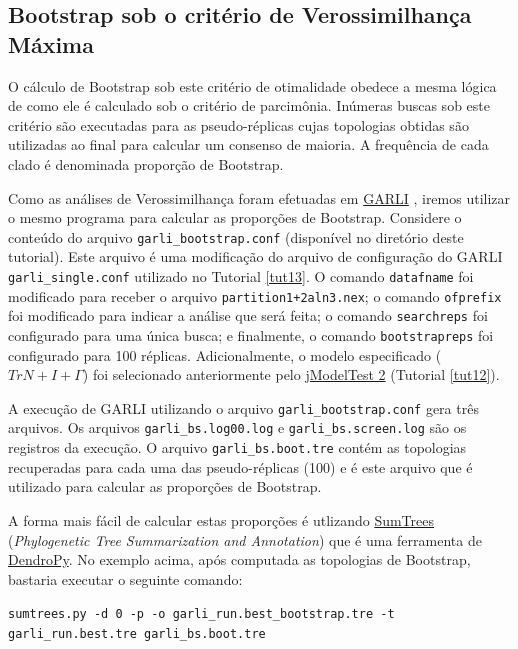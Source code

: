 \begin{refsection}
\subsection{Bootstrap sob o critério de Verossimilhança Máxima}\label{tut14:boots:likelihood}

O cálculo de Bootstrap sob este critério de otimalidade obedece a mesma lógica de como ele é calculado sob o critério de parcimônia. Inúmeras buscas sob este critério são executadas para as pseudo-réplicas cujas topologias obtidas são utilizadas ao final para calcular um consenso de maioria. A frequência de cada clado é denominada proporção de Bootstrap. 

Como as análises de Verossimilhança foram efetuadas em \href{https://www.nescent.org/wg_garli/Main_Page}{GARLI} \parencite[][]{Zwickl_2006}, iremos utilizar o mesmo programa para calcular as proporções de Bootstrap. Considere o conteúdo do arquivo \texttt{garli\_bootstrap.conf} (disponível no diretório deste tutorial). Este arquivo é uma modificação do arquivo de configuração do GARLI \texttt{garli\_single.conf} utilizado no Tutorial \ref{tut13}. O comando \texttt{datafname} foi modificado para receber o arquivo \texttt{partition1+2aln3.nex}; o comando \texttt{ofprefix} foi modificado para indicar a análise que será feita; o comando \texttt{searchreps} foi configurado para uma única busca; e finalmente, o comando \texttt{bootstrapreps} foi configurado para 100 réplicas. Adicionalmente, o modelo especificado ($TrN+I+\Gamma$) foi selecionado anteriormente pelo \href{http://code.google.com/p/jmodeltest2/}{jModelTest 2} (Tutorial \ref{tut12}).

A execução de GARLI utilizando o arquivo \texttt{garli\_bootstrap.conf} gera três arquivos. Os arquivos \texttt{garli\_bs.log00.log} e \texttt{garli\_bs.screen.log} são os registros da execução. O arquivo \texttt{garli\_bs.boot.tre} contém as topologias recuperadas para cada uma das pseudo-réplicas (100) e é este arquivo que é utilizado para calcular as proporções de Bootstrap.

A forma mais fácil de calcular estas proporções é utlizando \href{https://pythonhosted.org/DendroPy/programs/sumtrees.html}{SumTrees} (\textit{Phylogenetic Tree Summarization and Annotation}) que é uma ferramenta de \href{https://pythonhosted.org/DendroPy/}{DendroPy}. No exemplo acima, após computada as topologias de Bootstrap, bastaria executar o seguinte comando:\\

\scriptsize
\begin{center}
\texttt{sumtrees.py -d 0 -p -o garli\_run.best\_bootstrap.tre -t garli\_run.best.tre garli\_bs.boot.tre}\\    
\end{center}


\end{refsection}
